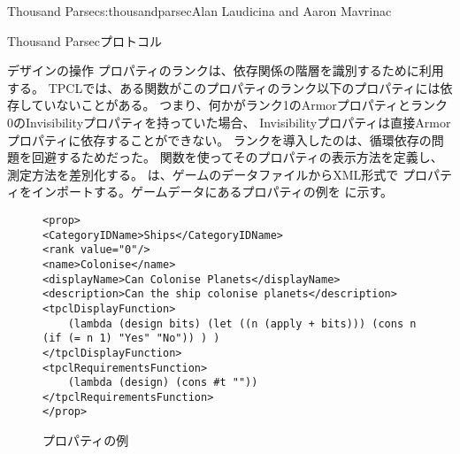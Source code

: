 \begin{aosachapter}{Thousand Parsec}{s:thousandparsec}{Alan Laudicina and Aaron Mavrinac}
\begin{aosasect1}{Thousand Parsecプロトコル}
\begin{aosasect2}{デザインの操作}
プロパティのランクは、依存関係の階層を識別するために利用する。
TPCLでは、ある関数がこのプロパティのランク以下のプロパティには依存していないことがある。
つまり、何かがランク1のArmorプロパティとランク0のInvisibilityプロパティを持っていた場合、
Invisibilityプロパティは直接Armorプロパティに依存することができない。
ランクを導入したのは、循環依存の問題を回避するためだった。
関数を使ってそのプロパティの表示方法を定義し、
測定方法を差別化する。
は、ゲームのデータファイルからXML形式で
プロパティをインポートする。ゲームデータにあるプロパティの例を
に示す。

\begin{figure}
\begin{verbatim}
<prop>
<CategoryIDName>Ships</CategoryIDName>
<rank value="0"/>
<name>Colonise</name>
<displayName>Can Colonise Planets</displayName>
<description>Can the ship colonise planets</description>
<tpclDisplayFunction>
    (lambda (design bits) (let ((n (apply + bits))) (cons n (if (= n 1) "Yes" "No")) ) )
</tpclDisplayFunction>
<tpclRequirementsFunction>
    (lambda (design) (cons #t ""))
</tpclRequirementsFunction>
</prop>
\end{verbatim}
\caption{プロパティの例}
\label{fig.tp.prop}
\end{figure}


\end{aosasect2}
\end{aosasect1}
\end{aosachapter}
